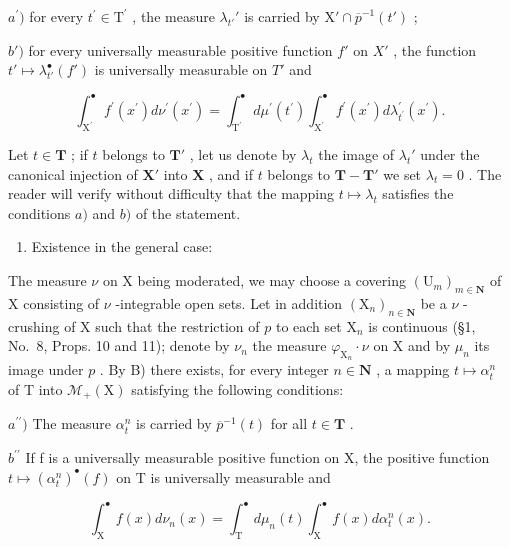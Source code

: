 \(a^{\prime})\) for every \(t^\prime \in \mathrm{T}^\prime\) , the measure \(\lambda_{t'}'\) is carried by \(\mathrm{X}' \cap \overline{p}^{-1}(t')\) ;

\(b')\) for every universally measurable positive function \(f'\) on \(X'\) , the function \(t' \mapsto \lambda_{t'}^{\bullet}(f')\) is universally measurable on \(T'\) and

\[
\int_ {\mathrm{X} ^ {\prime}} ^ {\bullet} f ^ {\prime} (x ^ {\prime}) d \nu^ {\prime} (x ^ {\prime}) = \int_ {\mathrm{T} ^ {\prime}} ^ {\bullet} d \mu^ {\prime} (t ^ {\prime}) \int_ {\mathrm{X} ^ {\prime}} ^ {\bullet} f ^ {\prime} (x ^ {\prime}) d \lambda_ {t ^ {\prime}} ^ {\prime} (x ^ {\prime}).
\]

Let \(t \in \mathbf{T}\) ; if \(t\) belongs to \(\mathbf{T}'\) , let us denote by \(\lambda_t\) the image of \(\lambda_t'\) under the canonical injection of \(\mathbf{X}'\) into \(\mathbf{X}\) , and if \(t\) belongs to \(\mathbf{T} - \mathbf{T}'\) we set \(\lambda_t = 0\) . The reader will verify without difficulty that the mapping \(t \mapsto \lambda_t\) satisfies the conditions \(a)\) and \(b)\) of the statement.

\begin{enumerate}
\def\labelenumi{\Alph{enumi})}
\setcounter{enumi}{2}
\tightlist
\item
  Existence in the general case:
\end{enumerate}

The measure \(\nu\) on X being moderated, we may choose a covering \((\mathrm{U}_m)_{m\in \mathbf{N}}\) of X consisting of \(\nu\) -integrable open sets. Let in addition \((\mathrm{X}_n)_{n\in \mathbf{N}}\) be a \(\nu\) -crushing of X such that the restriction of \(p\) to each set \(\mathrm{X}_n\) is continuous (§1, No.~8, Props. 10 and 11); denote by \(\nu_n\) the measure \(\varphi_{\mathrm{X}_n}\cdot \nu\) on X and by \(\mu_n\) its image under \(p\) . By B) there exists, for every integer \(n\in \mathbf{N}\) , a mapping \(t\mapsto \alpha_t^n\) of T into \(\mathcal{M}_{+}(\mathrm{X})\) satisfying the following conditions:

\(a^{\prime \prime})\) The measure \(\alpha_{t}^{n}\) is carried by \(\overline{p}^{-1}(t)\) for all \(t\in \mathbf{T}\) .

\(b^{\prime\prime}\) If f is a universally measurable positive function on X, the positive function \(t \mapsto (\alpha_{t}^{n})^{\bullet}(f)\) on T is universally measurable and

\[
\int_ {\mathrm{X}} ^ {\bullet} f (x) d \nu_ {n} (x) = \int_ {\mathrm{T}} ^ {\bullet} d \mu_ {n} (t) \int_ {\mathrm{X}} ^ {\bullet} f (x) d \alpha_ {t} ^ {n} (x).\tag{13}
\]

